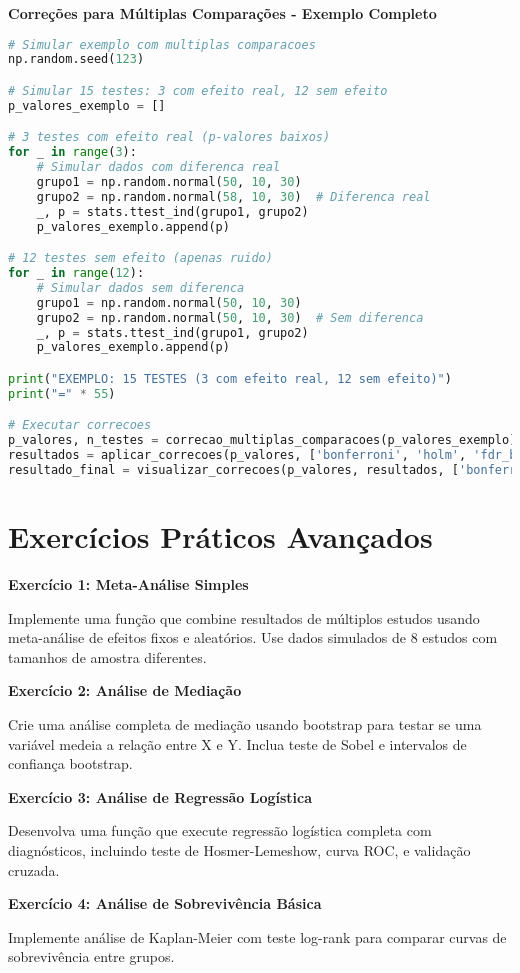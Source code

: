 \begin{examplebox}
\textbf{Correções para Múltiplas Comparações - Exemplo Completo}

\begin{lstlisting}[language=Python]
# Simular exemplo com multiplas comparacoes
np.random.seed(123)

# Simular 15 testes: 3 com efeito real, 12 sem efeito
p_valores_exemplo = []

# 3 testes com efeito real (p-valores baixos)
for _ in range(3):
    # Simular dados com diferenca real
    grupo1 = np.random.normal(50, 10, 30)
    grupo2 = np.random.normal(58, 10, 30)  # Diferenca real
    _, p = stats.ttest_ind(grupo1, grupo2)
    p_valores_exemplo.append(p)

# 12 testes sem efeito (apenas ruido)
for _ in range(12):
    # Simular dados sem diferenca
    grupo1 = np.random.normal(50, 10, 30)
    grupo2 = np.random.normal(50, 10, 30)  # Sem diferenca
    _, p = stats.ttest_ind(grupo1, grupo2)
    p_valores_exemplo.append(p)

print("EXEMPLO: 15 TESTES (3 com efeito real, 12 sem efeito)")
print("=" * 55)

# Executar correcoes
p_valores, n_testes = correcao_multiplas_comparacoes(p_valores_exemplo)
resultados = aplicar_correcoes(p_valores, ['bonferroni', 'holm', 'fdr_bh'])
resultado_final = visualizar_correcoes(p_valores, resultados, ['bonferroni', 'holm', 'fdr_bh'])
\end{lstlisting}
\end{examplebox}

\section{Exercícios Práticos Avançados}

\begin{examplebox}
\textbf{Exercício 1: Meta-Análise Simples}

Implemente uma função que combine resultados de múltiplos estudos usando meta-análise de efeitos fixos e aleatórios. Use dados simulados de 8 estudos com tamanhos de amostra diferentes.

\textbf{Exercício 2: Análise de Mediação}

Crie uma análise completa de mediação usando bootstrap para testar se uma variável medeia a relação entre X e Y. Inclua teste de Sobel e intervalos de confiança bootstrap.

\textbf{Exercício 3: Análise de Regressão Logística}

Desenvolva uma função que execute regressão logística completa com diagnósticos, incluindo teste de Hosmer-Lemeshow, curva ROC, e validação cruzada.

\textbf{Exercício 4: Análise de Sobrevivência Básica}

Implemente análise de Kaplan-Meier com teste log-rank para comparar curvas de sobrevivência entre grupos.
\end{examplebox}

